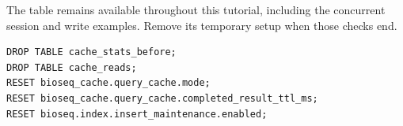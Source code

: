 The table remains available throughout this tutorial, including the concurrent
session and write examples. Remove its temporary setup when those checks end.

\par\noindent\begin{minipage}{\linewidth}
\begin{lstlisting}[style=bioseq-appendix-sql,
  caption={Remove the example objects and reset session settings.}]
DROP TABLE cache_stats_before;
DROP TABLE cache_reads;
RESET bioseq_cache.query_cache.mode;
RESET bioseq_cache.query_cache.completed_result_ttl_ms;
RESET bioseq.index.insert_maintenance.enabled;
\end{lstlisting}
\end{minipage}
